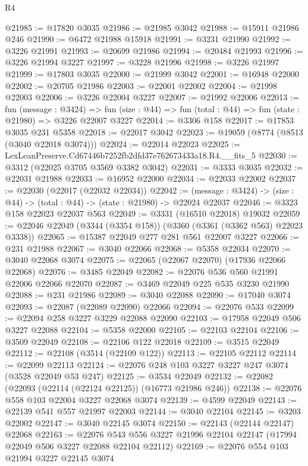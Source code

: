 \begin{lexlean}{R4}
\begin{coremodule}
@21985 := @17820 @3035
@21986 := @21985 @3042
@21988 := @15911 @21986 @246
@21990 := @6472 @21988 @15918
@21991 := @3231 @21990
@21992 := @3226 @21991
@21993 := @20699 @21986
@21994 := @20484 @21993
@21996 := @3226 @21994 @3227
@21997 := @3228 @21996
@21998 := @3226 @21997
@21999 := @17803 @3035
@22000 := @21999 @3042
@22001 := @16948 @22000
@22002 := @20705 @21986
@22003 := @22001 @22002
@22004 := @21998 @22003
@22006 := @3226 @22004 @3227
@22007 := @21992 @22006
@22013 := fun (message : @3424) =>
  fun (size : @44) => fun (total : @44) => fun (state : @21980) => @3226 @22007 @3227
@22014 := @3306 @158
@22017 := @17853 @3035 @231 @5358
@22018 := @22017 @3042
@22023 := @19059 (@8774 (@8513 (@3040 @22018 @3074)))
@22024 := @22014 @22023
@22025 := LexLeanPreserve.Cd67446b7252fb2dfd37e762673433a18.R4.__fits_5
@22030 := @3312 (@22025 @3705 @3569 @3382 @3042)
@22031 := @3333 @3035
@22032 := @22031 @21988
@22033 := @16952 @22000
@22034 := @22033 @22002
@22037 := @22030 (@22017 (@22032 @22034))
@22042 := (message : @3424) -> (size : @44) -> (total : @44) -> (state : @21980) -> @22024 @22037
@22046 := @3323 @158 @22023 @22037 @563
@22049 := @3331 (@16510 @22018) @19032
@22059 := @22046 @22049 (@3344 (@3354 @158)) (@3360 (@3361 (@3362 @563) @22023 @3338))
@22065 := @15387 @22049 @277 @281 @561 @22007 @3227
@22066 := @231 @21988
@22067 := @3040 @22066
@22068 := @5358 @22034
@22070 := @3040 @22068 @3074
@22075 := @22065 (@22067 @22070) (@17936 @22066 @22068)
@22076 := @3485 @22049
@22082 := @22076 @536 @560 @21991 @22006 @22066 @22070
@22087 := @3469 @22049 @225 @535 @3230 @21990
@22088 := @231 @21986
@22089 := @3040 @22088
@22090 := @17040 @3074
@22093 := @22087 (@22089 @22090) @22066
@22094 := @22076 @533
@22099 := @22094 @258 @3227 @3229 @22088 @22090
@22103 := @17958 @22049 @506 @3227 @22088
@22104 := @5358 @22000
@22105 := @22103 @22104
@22106 := @3509 @22049
@22108 := @22106 @122 @22018
@22109 := @3515 @22049
@22112 := @22108 (@3514 (@22109 @122))
@22113 := @22105 @22112
@22114 := @22099 @22113
@22124 := @22076 @248 @103 @3227 @3227 @247 @3074 (@3528 @22049 @53 @247)
@22125 := @3534 @22049
@22132 := @22082 (@22093 (@22114 (@22124 @22125)) (@16773 @21986 @246))
@22138 := @22076 @558 @103 @22004 @3227 @22068 @3074
@22139 := @4599 @22049
@22143 := @22139 @541 @557 @21997 @22003
@22144 := @3040 @22104
@22145 := @3203 @22002
@22147 := @3040 @22145 @3074
@22150 := @22143 (@22144 @22147) @22068
@22163 := @22076
    @543
    @556
    @3227
    @21996
    @22104
    @22147
    (@17994 @22049 @506 @3227 @22088 @22104 @22112)
@22169 := @22076 @554 @103 @21994 @3227 @22145 @3074

\end{coremodule}
\end{lexlean}

